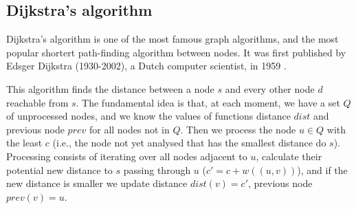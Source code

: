 \documentclass{report}[a4paper]
\theoremstyle{remark}
\begin{document}
\subsection{Dijkstra's algorithm}
Dijkstra's algorithm is one of the most famous graph algorithms, and the most popular shortert path-finding algorithm between nodes. It was first published by Edsger Dijkstra (1930-2002), a Dutch computer scientist, in 1959 \cite{dijkstra}.\par
This algorithm finds the distance between a node $s$ and every other node $d$ reachable from $s$. The fundamental idea is that, at each moment, we have a set $Q$ of unprocessed nodes, and we know the values of functions distance $dist$ and previous node $prev$ for all nodes not in $Q$. Then we process the node $u \in Q$ with the least $c$ (i.e., the node not yet analysed that has the smallest distance do $s$). Processing consists of iterating over all nodes adjacent to $u$, calculate their potential new distance to $s$ passing through $u$ ($c'=c+w((u,v))$), and if the new distance is smaller we update distance $dist(v)=c'$, previous node $prev(v)=u$.
\vspace{-1em}
\end{document}
